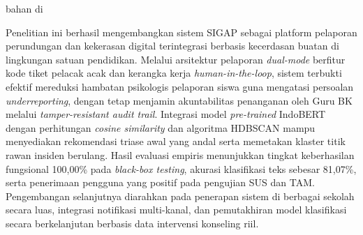 bahan di\documentclass[conference]{IEEEtran}
\begin{document}
Penelitian ini berhasil mengembangkan sistem SIGAP sebagai platform pelaporan perundungan dan kekerasan digital terintegrasi berbasis kecerdasan buatan di lingkungan satuan pendidikan. Melalui arsitektur pelaporan \textit{dual-mode} berfitur kode tiket pelacak acak dan kerangka kerja \textit{human-in-the-loop}, sistem terbukti efektif mereduksi hambatan psikologis pelaporan siswa guna mengatasi persoalan \textit{underreporting}, dengan tetap menjamin akuntabilitas penanganan oleh Guru BK melalui \textit{tamper-resistant audit trail}. Integrasi model \textit{pre-trained} IndoBERT dengan perhitungan \textit{cosine similarity} dan algoritma HDBSCAN mampu menyediakan rekomendasi triase awal yang andal serta memetakan klaster titik rawan insiden berulang. Hasil evaluasi empiris menunjukkan tingkat keberhasilan fungsional 100,00\% pada \textit{black-box testing}, akurasi klasifikasi teks sebesar 81,07\%, serta penerimaan pengguna yang positif pada pengujian SUS dan TAM. Pengembangan selanjutnya diarahkan pada penerapan sistem di berbagai sekolah secara luas, integrasi notifikasi multi-kanal, dan pemutakhiran model klasifikasi secara berkelanjutan berbasis data intervensi konseling riil.
\end{document}
